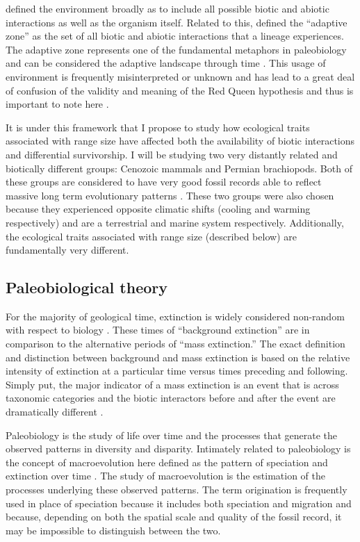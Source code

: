 \documentclass[12pt,letterpaper]{article}
\begin{document}
\citet{Simpson1944} defined the environment broadly as to include all possible biotic and abiotic interactions as well as the organism itself. Related to this, \citet{Simpson1944} defined the ``adaptive zone'' as the set of all biotic and abiotic interactions that a lineage experiences. The adaptive zone represents one of the fundamental metaphors in paleobiology and can be considered the adaptive landscape through time \citep{Simpson1944,Simpson1953}. This usage of environment is frequently misinterpreted or unknown and has lead to a great deal of confusion of the validity and meaning of the Red Queen hypothesis and thus is important to note here \citep{VanValen1973,Barnosky2001a,Liow2011a}. 

It is under this framework that I propose to study how ecological traits associated with range size have affected both the availability of biotic interactions and differential survivorship. I will be studying two very distantly related and biotically different groups: Cenozoic mammals and Permian brachiopods. Both of these groups are considered to have very good fossil records able to reflect massive long term evolutionary patterns \citep{Mark1977}. These two groups were also chosen because they experienced opposite climatic shifts (cooling and warming respectively) and are a terrestrial and marine system respectively. Additionally, the ecological traits associated with range size (described below) are fundamentally very different. 



\subsection{Paleobiological theory}
For the majority of geological time, extinction is widely considered non-random with respect to biology \citep{Jablonski1986}. These times of ``background extinction'' are in comparison to the alternative periods of ``mass extinction.'' The exact definition and distinction between background and mass extinction is based on the relative intensity of extinction at a particular time versus times preceding and following. Simply put, the major indicator of a mass extinction is an event that is across taxonomic categories and the biotic interactors before and after the event are dramatically different \citep{Jablonski1986,Jablonski2005,Kitchell1986,Kitchell1991}.

Paleobiology is the study of life over time and the processes that generate the observed patterns in diversity and disparity. Intimately related to paleobiology is the concept of macroevolution here defined as the pattern of speciation and extinction over time \citep{Jablonski2008a}. The study of macroevolution is the estimation of the processes underlying these observed patterns. The term origination is frequently used in place of speciation because it includes both speciation and migration and because, depending on both the spatial scale and quality of the fossil record, it may be impossible to distinguish between the two.
\end{document}
